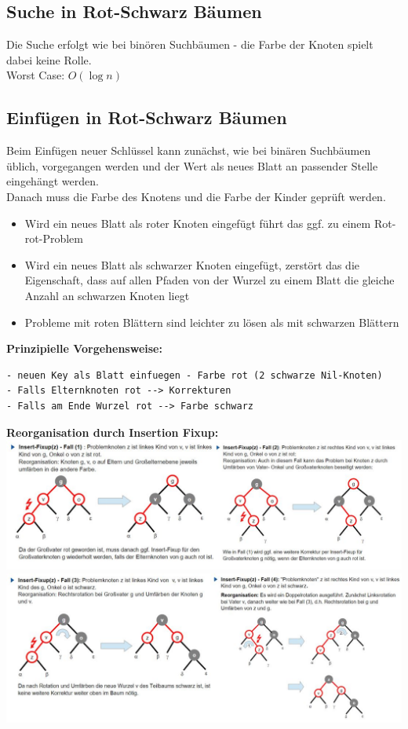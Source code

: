 \documentclass{scrreprt}
\begin{document}
\subsection{Suche in Rot-Schwarz Bäumen}
Die Suche erfolgt wie bei binören Suchbäumen - die Farbe der Knoten spielt dabei keine Rolle.
\\Worst Case: $O(\log n)$
\subsection{Einfügen in Rot-Schwarz Bäumen}
Beim Einfügen neuer Schlüssel kann zunächst, wie bei binären Suchbäumen üblich, vorgegangen werden und der
Wert als neues Blatt an passender Stelle eingehängt werden.
\\Danach muss die Farbe des Knotens und die Farbe der Kinder geprüft werden.
\begin{itemize}
  \item Wird ein neues Blatt als roter Knoten eingefügt führt das ggf. zu einem Rot-rot-Problem
  \item Wird ein neues Blatt als schwarzer Knoten eingefügt, zerstört das die Eigenschaft, 
  dass auf allen Pfaden von der Wurzel zu einem Blatt die gleiche Anzahl an schwarzen Knoten liegt
  \item Probleme mit roten Blättern sind leichter zu lösen als mit schwarzen Blättern
\end{itemize}
\textbf{Prinzipielle Vorgehensweise:}
\begin{lstlisting}
- neuen Key als Blatt einfuegen - Farbe rot (2 schwarze Nil-Knoten)
- Falls Elternknoten rot --> Korrekturen 
- Falls am Ende Wurzel rot --> Farbe schwarz
\end{lstlisting}
\textbf{Reorganisation durch Insertion Fixup:}
\\\includegraphics[width=1\textwidth]{graphics/Fixup1}
\\\includegraphics[width=1\textwidth]{graphics/Fixup2}
\end{document}
